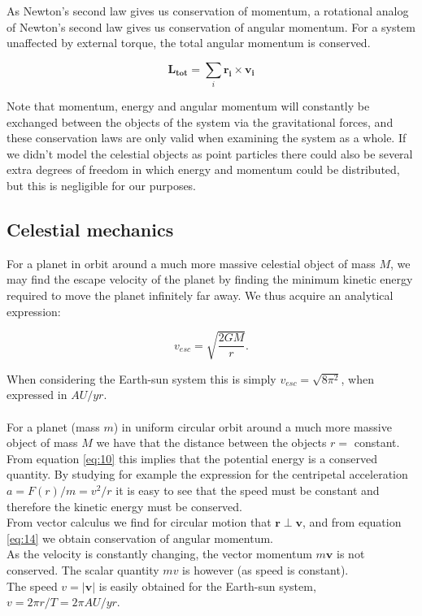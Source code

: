 \documentclass[%
 reprint,
 nobalance,
 amsmath,amssymb,
 aps,
]{revtex4-1}
\begin{document}
As Newton's second law gives us conservation of momentum, a rotational analog of Newton's second law gives us conservation of angular momentum.
For a system unaffected by external torque, the total angular momentum is conserved.

\begin{equation}\label{eq:14}
	\bm{L_{tot}} = \sum_{i}{\bm{r_i} \times \bm{v_i}}
\end{equation}

Note that momentum, energy and angular momentum will constantly be exchanged between the objects of the system via the gravitational forces, and these conservation laws are only valid when examining the system as a whole. If we didn't model the celestial objects as point particles there could also be several extra degrees of freedom in which energy and momentum could be distributed, but this is negligible for our purposes.

\subsection{\label{sec:Cel}Celestial mechanics}
For a planet in orbit around a much more massive celestial object of mass $M$, we may find the escape velocity of the planet by finding the minimum kinetic energy required to move the planet infinitely far away. We thus acquire an analytical expression:

\begin{equation}\label{eq:escape_vel}
	v_{esc} = \sqrt{\frac{2GM}{r}}.
\end{equation}

When considering the Earth-sun system this is simply $v_{esc} = \sqrt{8\pi^{2}}$, when expressed in $AU/yr$. \\ \\
For a planet (mass $m$) in uniform circular orbit around a much more massive object of mass $M$ we have that the distance between the objects $r = $ constant. From equation \eqref{eq:10} this implies that the potential energy is a conserved quantity. By studying for example the expression for the centripetal acceleration $a = F(r)/m = v^{2}/r$ it is easy to see that the speed must be constant and therefore the kinetic energy must be conserved.\\
From vector calculus we find for circular motion that $\bm{r} \perp \bm{v}$, and from equation \eqref{eq:14} we obtain conservation of angular momentum.\\
As the velocity is constantly changing, the vector momentum $m\bm{v}$ is not conserved. The scalar quantity $mv$ is however (as speed is constant).\\
The speed $v = \left|\bm{v} \right|$ is easily obtained for the Earth-sun system, $v = 2\pi r/T = 2\pi AU/yr$.
\end{document}

